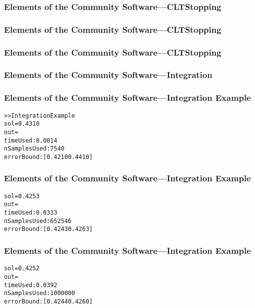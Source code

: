 \documentclass[11pt,compress,xcolor={usenames,dvipsnames},aspectratio=169]{beamer}
\begin{document}
\begin{frame}[fragile]
\frametitle{Elements of the Community Software---CLTStopping}
\vspace{-5ex}

\end{frame}


\begin{frame}[fragile]
\frametitle{Elements of the Community Software---CLTStopping}
\vspace{-5ex}

\end{frame}

\begin{frame}[fragile]
\frametitle{Elements of the Community Software---CLTStopping}
\vspace{-5ex}

\end{frame}

\begin{frame}[fragile]
\frametitle{Elements of the Community Software---Integration}
\vspace{-5ex}

\end{frame}

\begin{frame}[fragile]
\frametitle{Elements of the Community Software---Integration Example}
\vspace{-5ex}


\begin{alltt}
>> IntegrationExample
sol = 0.4310
out = 
timeUsed: 0.0014
nSamplesUsed: 7540
errorBound: [0.4210 0.4410]
\end{alltt}
\end{frame}

\begin{frame}[fragile]
\frametitle{Elements of the Community Software---Integration Example}
\vspace{-5ex}


\begin{alltt}
sol = 0.4253
out = 
timeUsed: 0.0333
nSamplesUsed: 652546
errorBound: [0.4243 0.4263]
\end{alltt}
\end{frame}

\begin{frame}[fragile]
\frametitle{Elements of the Community Software---Integration Example}
\vspace{-5ex}


\begin{alltt}
sol = 0.4252
out = 
timeUsed: 0.0392
nSamplesUsed: 1000000
errorBound: [0.4244 0.4260]
\end{alltt}
\end{frame}
\end{document}
